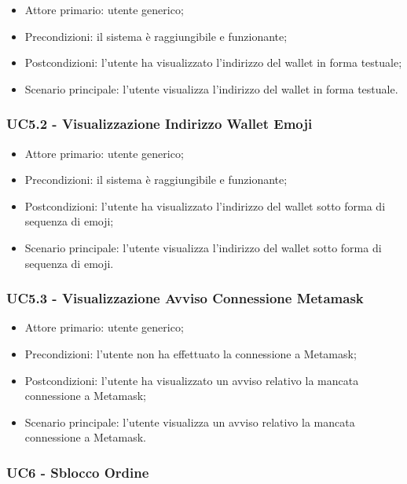 \begin{itemize}
    \item Attore primario: utente generico;
    \item Precondizioni: il sistema è raggiungibile e funzionante;
    \item Postcondizioni: l'utente ha visualizzato l'indirizzo del wallet in forma testuale;
    \item Scenario principale: l'utente visualizza l'indirizzo del wallet in forma testuale.
\end{itemize}

\subsubsection{UC5.2 - Visualizzazione Indirizzo Wallet Emoji}

\begin{itemize}
    \item Attore primario: utente generico;
    \item Precondizioni: il sistema è raggiungibile e funzionante;
    \item Postcondizioni: l'utente ha visualizzato l'indirizzo del wallet sotto forma di sequenza di emoji;
    \item Scenario principale: l'utente visualizza l'indirizzo del wallet sotto forma di sequenza di emoji.
\end{itemize}

\subsubsection{UC5.3 - Visualizzazione Avviso Connessione Metamask}

\begin{itemize}
    \item Attore primario: utente generico;
    \item Precondizioni: l'utente non ha effettuato la connessione a Metamask;
    \item Postcondizioni: l'utente ha visualizzato un avviso relativo la mancata connessione a Metamask;
    \item Scenario principale: l'utente visualizza un avviso relativo la mancata connessione a Metamask.
\end{itemize}

\subsubsection{UC6 - Sblocco Ordine}

